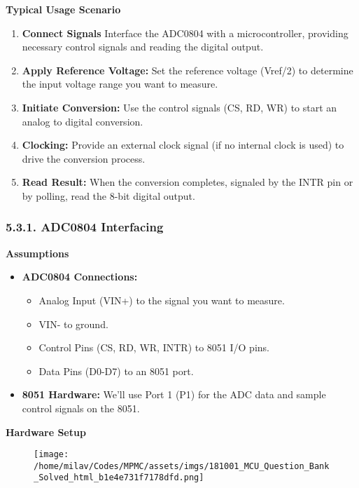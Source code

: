 \documentclass[
]{article}
\begin{document}
\textbf{Typical Usage Scenario}

\begin{enumerate}
\def\labelenumi{\arabic{enumi}.}
\item
  \textbf{Connect Signals} Interface the ADC0804 with a microcontroller,
  providing necessary control signals and reading the digital output.
\item
  \textbf{Apply Reference Voltage:} Set the reference voltage (Vref/2)
  to determine the input voltage range you want to measure.
\item
  \textbf{Initiate Conversion:} Use the control signals (CS, RD, WR) to
  start an analog to digital conversion.
\item
  \textbf{Clocking:} Provide an external clock signal (if no internal
  clock is used) to drive the conversion process.
\item
  \textbf{Read Result:} When the conversion completes, signaled by the
  INTR pin or by polling, read the 8-bit digital output.
\end{enumerate}

\hypertarget{531-adc0804-interfacing}{%
\subsubsection{5.3.1. ADC0804
Interfacing}\label{531-adc0804-interfacing}}

\textbf{Assumptions}

\begin{itemize}
\item
  \textbf{ADC0804 Connections:}

  \begin{itemize}
  \item
    Analog Input (VIN+) to the signal you want to measure.
  \item
    VIN- to ground.
  \item
    Control Pins (CS, RD, WR, INTR) to 8051 I/O pins.
  \item
    Data Pins (D0-D7) to an 8051 port.
  \end{itemize}
\item
  \textbf{8051 Hardware:} We'll use Port 1 (P1) for the ADC data and
  sample control signals on the 8051.
\end{itemize}

\textbf{Hardware Setup}

\begin{figure}
\centering
\texttt{[image: /home/milav/Codes/MPMC/assets/imgs/181001\_MCU\_Question\_Bank\_Solved\_html\_b1e4e731f7178dfd.png]}
\caption{}
\end{figure}
\end{document}
